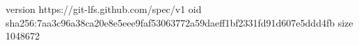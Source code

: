 version https://git-lfs.github.com/spec/v1
oid sha256:7aa3c96a38ca20e8e5eee9faf53063772a59daeff1bf2331fd91d607e5ddd4fb
size 1048672
